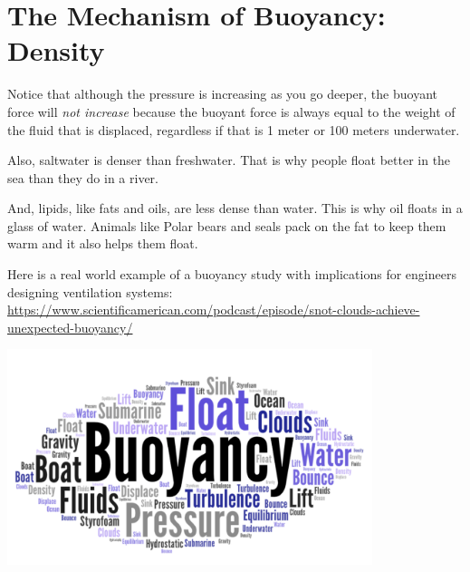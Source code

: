 \section{The Mechanism of Buoyancy: Density}
Notice that although the pressure is increasing as you go deeper, the
buoyant force will \emph{not increase} because the buoyant force is always equal
to the weight of the fluid that is displaced, regardless if that is 1
meter or 100 meters underwater.

Also, saltwater is denser than freshwater. That is why people float
better in the sea than they do in a river.

And, lipids, like fats and oils, are less dense than water. This is why oil floats in a glass of water. Animals like Polar bears and seals pack on the fat to keep them warm and it also helps them float. 

Here is a real world example of a buoyancy study with implications for engineers designing ventilation systems: 
\url{https://www.scientificamerican.com/podcast/episode/snot-clouds-achieve-unexpected-buoyancy/}

\includegraphics[width=0.8\textwidth]{bouy_word_cloud.png}




